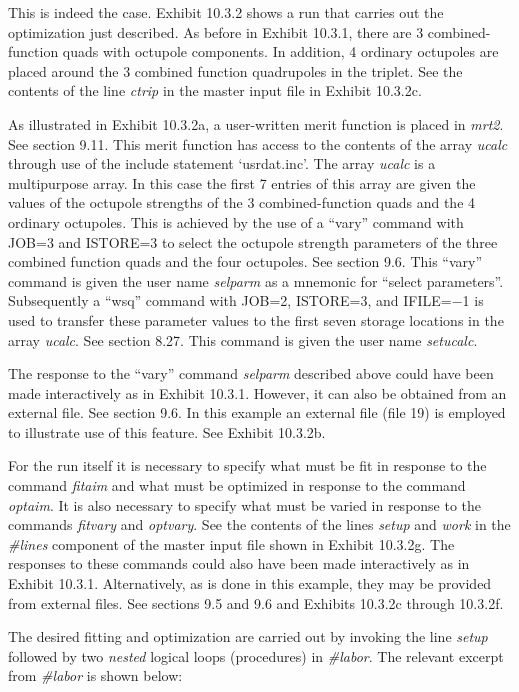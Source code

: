 This is indeed the case.  Exhibit 10.3.2 shows a \Mary run that carries
out the optimization just described.  As before in Exhibit 10.3.1, there
are 3 combined-function quads with octupole components.  In addition, 4
ordinary octupoles are placed around the 3 combined function quadrupoles
in the triplet.  See the contents of the line {\em ctrip} in the
\Mary master input file in Exhibit 10.3.2c.

As illustrated  in Exhibit 10.3.2a, a user-written merit function is
placed in {\em mrt2}.  See section 9.11.  This merit function has access
to the contents of the array {\em ucalc} through use of the include
statement `usrdat.inc'.  The array {\em ucalc} is a multipurpose array.
In this case the first 7 entries of this array are given the values of
the octupole strengths of the 3 combined-function quads and the 4
ordinary octupoles.  This is achieved by the use of a ``vary'' command
with JOB=3 and ISTORE=3 to select the octupole strength parameters of the
three combined function quads and the four octupoles.  See section 9.6.
This ``vary'' command is given the user name {\em selparm} as a mnemonic
for ``select parameters''.  Subsequently a ``wsq'' command with JOB=2,
ISTORE=3,
and IFILE=$-$1 is used to transfer these parameter values to the first
seven storage locations in the array {\em ucalc}.  See section 8.27.
This command is given the user name {\em setucalc}.

The response to the ``vary'' command {\em selparm} described above could
have been made interactively as in Exhibit 10.3.1.  However, it can also
be obtained from an external file.  See section 9.6.  In this example an
external file (file 19) is employed to illustrate use of this feature.
See Exhibit 10.3.2b.

For the \Mary run itself it is necessary to specify what must be fit in
response to the command {\em fitaim} and what must be optimized in
response to the command {\em optaim}.  It is also necessary to specify
what must be varied in response to the commands {\em fitvary} and {\em
optvary}.  See the contents of the lines {\em setup} and {\em work} in
the {\em \#lines} component of the master input file shown in Exhibit
10.3.2g.  The responses to these commands could also have been made
interactively as in Exhibit 10.3.1.  Alternatively, as is done in this
example, they may be provided from external files.  See sections 9.5 and
9.6 and Exhibits 10.3.2c through 10.3.2f.

The desired fitting and optimization are carried out by invoking the line
{\em setup} followed by two {\em nested} logical loops (procedures) in {\em \#labor}.  The
relevant excerpt from {\em \#labor} is shown below:

